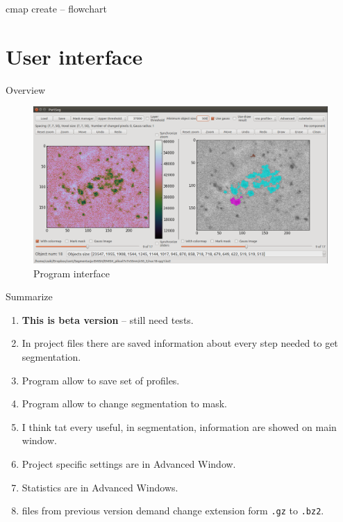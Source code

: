 \documentclass[10pt,usenames,dvipsnames]{beamer}
\begin{document}
\begin{frame}[c]{cmap create – flowchart}
\end{frame}

\section{User interface}
\begin{frame}[c]{Overview}
  \begin{figure}[htpb]
    \centering
    \includegraphics[width=1\linewidth]{interface}
    \caption{Program interface}
    \label{fig:name}
  \end{figure}
\end{frame}
\begin{frame}[c]{Summarize}
  \begin{enumerate}
    \item \textbf{This is beta version} – still need tests.
    \item In project files there are saved information about every step needed to get segmentation. 
    \item Program allow to save set of profiles.
    \item Program allow to change segmentation to mask. 
    \item I think tat every useful, in segmentation, information are showed on main window.
    \item Project specific settings are in Advanced Window.
    \item Statistics are in Advanced Windows.
    \item files from previous version demand change extension form \texttt{.gz} to \texttt{.bz2}.
  \end{enumerate}  
\end{frame}
\end{document}
